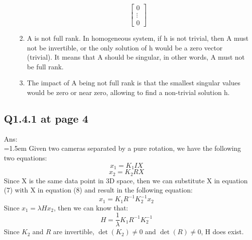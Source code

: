 \documentclass[12pt]{article}
\begin{document}
\begin{enumerate}
\begin{enumerate}
\[\begin{bmatrix}
					0 \\
					\vdots \\
					0
				\end{bmatrix}
				\]
				\item A is not full rank. In homogeneous system, if h is not trivial, then A must not be invertible, or the only solution of h would be a zero vector (trivial). It means that A should be singular, in other words, A must not be full rank.
				\item The impact of A being not full rank is that the smallest singular values would be zero or near zero, allowing to find a non-trivial solution h.
			\end{enumerate}
	\end{enumerate}

	\newpage
	\subsection*{Q1.4.1 at page 4}
	Ans:\\
	\hangindent=1.5em \hspace{1.5em} Given two cameras separated by a pure rotation, we have the following two equations:
	\begin{equation}
		x_1 = K_1 I X
	\end{equation}
	\begin{equation}
		x_2 = K_2 R X
	\end{equation}
	Since X is the same data point in 3D space, then we can substitute X in equation (7) with X in equation (8) and result in the following equation:
	\begin{equation}
		x_1 = K_1 R^{-1} K_2^{-1} x_2
	\end{equation}
	Since $x_1 = \lambda H x_2$, then we can know that:
	\begin{equation}
		H = \frac{1}{\lambda} K_1 R^{-1} K_2^{-1}
	\end{equation}
	Since $K_2$ and $R$ are invertible, $\det(K_2) \neq 0$ and $\det(R) \neq 0$, H does exist.
	
	\newpage
\end{document}
